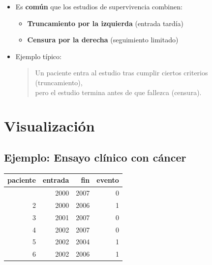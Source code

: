 \documentclass[
  letterpaper,
  DIV=11,
  numbers=noendperiod]{scrartcl}
\providecommand{\tightlist}{%
  \setlength{\itemsep}{0pt}\setlength{\parskip}{0pt}}
\begin{document}
\begin{itemize}
\item
  Es \textbf{común} que los estudios de supervivencia combinen:

  \begin{itemize}
  \tightlist
  \item
    \textbf{Truncamiento por la izquierda} (entrada tardía)
  \item
    \textbf{Censura por la derecha} (seguimiento limitado)
  \end{itemize}
\item
  Ejemplo típico:

  \begin{quote}
  Un paciente entra al estudio tras cumplir ciertos criterios
  (truncamiento),\\
  pero el estudio termina antes de que fallezca (censura).
  \end{quote}
\end{itemize}

\section{Visualización}\label{visualizaciuxf3n}

\subsection{Ejemplo: Ensayo clínico con
cáncer}\label{ejemplo-ensayo-cluxednico-con-cuxe1ncer}

\begin{longtable}[]{@{}rrrr@{}}
\toprule\noalign{}
paciente & entrada & fin & evento \\
\midrule\noalign{}
\endhead
\bottomrule\noalign{}
\endlastfoot
1 & 2000 & 2007 & 0 \\
2 & 2000 & 2006 & 1 \\
3 & 2001 & 2007 & 0 \\
4 & 2002 & 2007 & 0 \\
5 & 2002 & 2004 & 1 \\
6 & 2002 & 2006 & 1 \\
\end{longtable}
\end{document}
